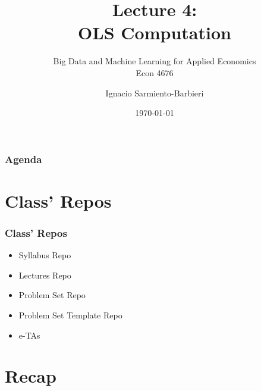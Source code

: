 \documentclass[
  shownotes,
  xcolor={svgnames},
  hyperref={colorlinks,citecolor=DarkBlue,linkcolor=DarkRed,urlcolor=DarkBlue}
  , aspectratio=169]{beamer}
\begin{document}
\title[Lecture 6]{Lecture 4: \\ OLS Computation }
\subtitle{Big Data and Machine Learning for Applied Economics \\ Econ 4676}
\date{\today}

\author[Sarmiento-Barbieri]{Ignacio Sarmiento-Barbieri}


\begin{frame}[noframenumbering]
\maketitle
\end{frame}





\begin{frame}
\frametitle{Agenda}

\tableofcontents


\end{frame}
\section{Class' Repos}
\begin{frame}[fragile]
\frametitle{Class' Repos}


\begin{itemize}
\item Syllabus Repo
\medskip
\item Lectures Repo
\medskip
\item Problem Set Repo
\medskip
\item Problem Set  Template Repo
\medskip
\item e-TAs
\end{itemize}

\end{frame}

\section{Recap}
\end{document}
